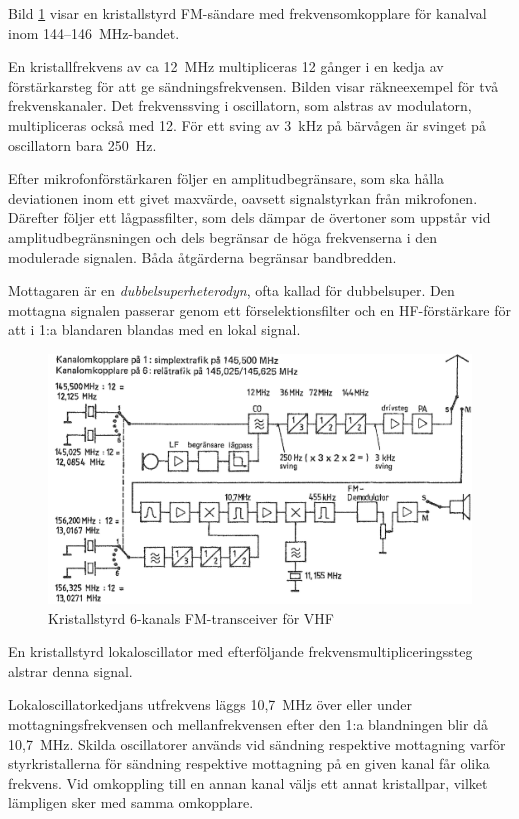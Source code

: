 Bild \ref{fig:bildII5-12} visar en kristallstyrd FM-sändare med
frekvensomkopplare för kanalval inom 144--146~MHz-bandet.

En kristallfrekvens av ca 12~MHz multipliceras 12 gånger i en kedja
av förstärkarsteg för att ge sändningsfrekvensen.
Bilden visar räkneexempel för två frekvenskanaler.
Det frekvenssving i oscillatorn, som alstras av modulatorn,
multipliceras också med 12.
För ett sving av 3~kHz på bärvågen är svinget på oscillatorn bara 250~Hz.

Efter mikrofonförstärkaren följer en amplitudbegränsare, som ska
hålla deviationen inom ett givet maxvärde, oavsett signalstyrkan från
mikrofonen.
Därefter följer ett lågpassfilter, som dels dämpar de övertoner som
uppstår vid amplitudbegränsningen och dels begränsar de höga frekvenserna
i den modulerade signalen.
Båda åtgärderna begränsar bandbredden.

Mottagaren är en \emph{dubbelsuperheterodyn}, ofta kallad för dubbelsuper.
Den mottagna signalen passerar genom ett förselektionsfilter och en
HF-förstärkare för att i 1:a blandaren blandas med en lokal signal.

\begin{figure}
  \includegraphics[width=\textwidth]{images/cropped_pdfs/bild_2_5-12.pdf}
  \caption{Kristallstyrd 6-kanals FM-transceiver för VHF}
  \label{fig:bildII5-12}
\end{figure}



En kristallstyrd lokaloscillator med efterföljande
frekvensmultipliceringssteg alstrar denna signal.

Lokaloscillatorkedjans utfrekvens läggs 10,7~MHz över eller under
mottagningsfrekvensen och mellanfrekvensen efter den 1:a blandningen
blir då 10,7~MHz.
Skilda oscillatorer används vid sändning respektive mottagning varför
styrkristallerna för sändning respektive mottagning på en given kanal får
olika frekvens.
Vid omkoppling till en annan kanal väljs ett annat kristallpar, vilket
lämpligen sker med samma omkopplare.

